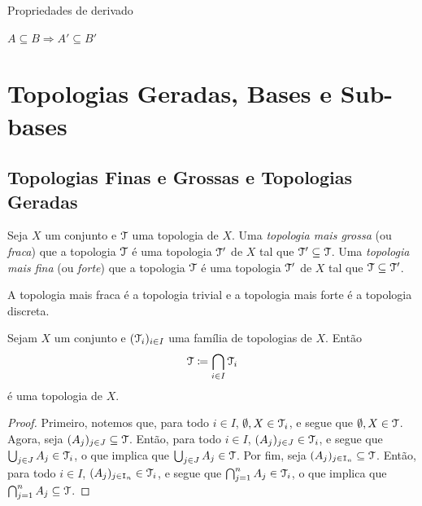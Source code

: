 Propriedades de derivado

$A \subseteq B \Rightarrow A' \subseteq B'$


\chapter{Topologias Geradas, Bases e Sub-bases}

\section{Topologias Finas e Grossas e Topologias Geradas}

\begin{defi}
	Seja $X$ um conjunto e $\mathcal{T}$ uma topologia de $X$. Uma \emph{topologia mais grossa} (ou \emph{fraca}) que a topologia $\mathcal{T}$ é uma topologia $\mathcal{T}'$ de $X$ tal que $\mathcal{T}' \subseteq \mathcal{T}$. Uma \emph{topologia mais fina} (ou \emph{forte}) que a topologia $\mathcal{T}$ é uma topologia $\mathcal{T}'$ de $X$ tal que $\mathcal{T} \subseteq \mathcal{T}'$.
\end{defi}

	A topologia mais fraca é a topologia trivial e a topologia mais forte é a topologia discreta.

\begin{prop}
	Sejam $X$ um conjunto e $(\mathcal{T}_i)_{i \in I}$ uma família de topologias de $X$. Então
	\begin{equation*}
	\topo \coloneqq \bigcap_{i \in I} \topo_i
	\end{equation*}
é uma topologia de $X$.
\end{prop}
\begin{proof}
	Primeiro, notemos que, para todo $i \in I$, $\emptyset,X \in \mathcal{T}_i$, e segue que $\emptyset,X \in \mathcal{T}$. Agora, seja $(A_j)_{j \in J} \subseteq \mathcal{T}$.  Então, para todo $i \in I$, $(A_j)_{j \in J} \in \mathcal{T}_i$, e segue que $\bigcup_{j \in J} A_j \in \mathcal{T}_i$, o que implica que $\bigcup_{j \in J} A_j \in \mathcal{T}$. Por fim, seja $(A_j)_{j \in \mathtt I_n} \subseteq \mathcal{T}$. Então, para todo $i \in I$, $(A_j)_{j \in \mathtt I_n} \in \mathcal{T}_i$, e segue que $\bigcap_{j=1}^n A_j \in \mathcal{T}_i$, o que implica que $\bigcap_{j=1}^n A_j \subseteq \mathcal{T}$.
\end{proof}




